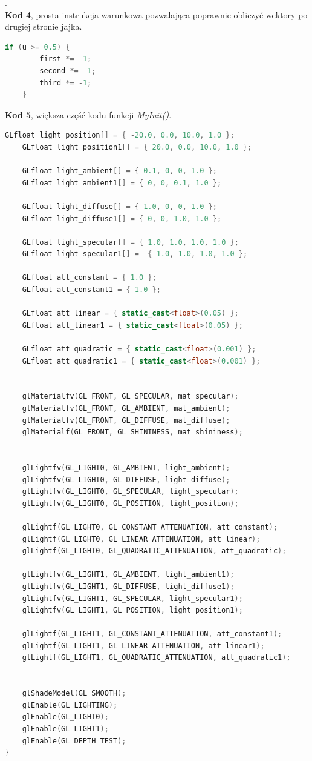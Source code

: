 \documentclass[polish,polish,a4paper]{article}
\begin{document}
.\\
\textbf{Kod 4}, prosta instrukcja warunkowa pozwalająca poprawnie obliczyć wektory po drugiej stronie jajka.
{\small
\begin{lstlisting}[language=C++]
   if (u >= 0.5) {
		first *= -1;
		second *= -1;
		third *= -1;
	}
\end{lstlisting}
}



\textbf{Kod 5}, większa część kodu funkcji \textit{MyInit()}.
{\small
\begin{lstlisting}[language=C++]
GLfloat light_position[] = { -20.0, 0.0, 10.0, 1.0 };
	GLfloat light_position1[] = { 20.0, 0.0, 10.0, 1.0 };

	GLfloat light_ambient[] = { 0.1, 0, 0, 1.0 };
	GLfloat light_ambient1[] = { 0, 0, 0.1, 1.0 };

	GLfloat light_diffuse[] = { 1.0, 0, 0, 1.0 };
	GLfloat light_diffuse1[] = { 0, 0, 1.0, 1.0 };
	
	GLfloat light_specular[] = { 1.0, 1.0, 1.0, 1.0 };
	GLfloat light_specular1[] =  { 1.0, 1.0, 1.0, 1.0 };

	GLfloat att_constant = { 1.0 };
	GLfloat att_constant1 = { 1.0 };

	GLfloat att_linear = { static_cast<float>(0.05) };
	GLfloat att_linear1 = { static_cast<float>(0.05) };

	GLfloat att_quadratic = { static_cast<float>(0.001) };
	GLfloat att_quadratic1 = { static_cast<float>(0.001) };


	glMaterialfv(GL_FRONT, GL_SPECULAR, mat_specular);
	glMaterialfv(GL_FRONT, GL_AMBIENT, mat_ambient);
	glMaterialfv(GL_FRONT, GL_DIFFUSE, mat_diffuse);
	glMaterialf(GL_FRONT, GL_SHININESS, mat_shininess);


	glLightfv(GL_LIGHT0, GL_AMBIENT, light_ambient);
	glLightfv(GL_LIGHT0, GL_DIFFUSE, light_diffuse);
	glLightfv(GL_LIGHT0, GL_SPECULAR, light_specular);
	glLightfv(GL_LIGHT0, GL_POSITION, light_position);

	glLightf(GL_LIGHT0, GL_CONSTANT_ATTENUATION, att_constant);
	glLightf(GL_LIGHT0, GL_LINEAR_ATTENUATION, att_linear);
	glLightf(GL_LIGHT0, GL_QUADRATIC_ATTENUATION, att_quadratic);

	glLightfv(GL_LIGHT1, GL_AMBIENT, light_ambient1);
	glLightfv(GL_LIGHT1, GL_DIFFUSE, light_diffuse1);
	glLightfv(GL_LIGHT1, GL_SPECULAR, light_specular1);
	glLightfv(GL_LIGHT1, GL_POSITION, light_position1);

	glLightf(GL_LIGHT1, GL_CONSTANT_ATTENUATION, att_constant1);
	glLightf(GL_LIGHT1, GL_LINEAR_ATTENUATION, att_linear1);
	glLightf(GL_LIGHT1, GL_QUADRATIC_ATTENUATION, att_quadratic1);


	glShadeModel(GL_SMOOTH); 
	glEnable(GL_LIGHTING);   
	glEnable(GL_LIGHT0);     
	glEnable(GL_LIGHT1);    
	glEnable(GL_DEPTH_TEST); 
}
\end{lstlisting}
}
\end{document}
